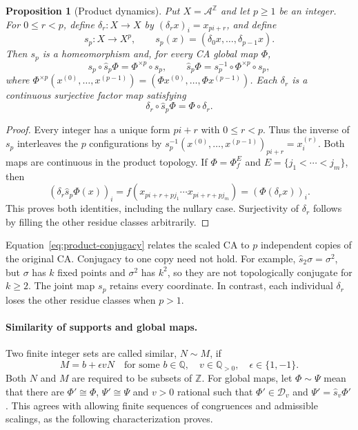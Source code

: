\documentclass[11pt,a4paper]{article}
\newenvironment{revision}{\color{blue}}{}
\newenvironment{revision}{\color{black}}{}
\newcommand{\locmark}[1]{\label{#1}\linelabel{line:#1}}
\newtheorem{prop}{Proposition}
\begin{document}
\begin{revision}
\begin{prop}[Product dynamics]\label{prop:product}
\locmark{loc:product}
Put $X=\mathcal A^{\mathbb Z}$ and let $p\geq1$ be an integer.
For $0\leq r<p$, define $\delta_r:X\to X$ by
$(\delta_rx)_i=x_{pi+r}$, and define
\[
s_p:X\longrightarrow X^p,\qquad
s_p(x)=(\delta_0x,\ldots,\delta_{p-1}x).
\]
Then $s_p$ is a homeomorphism and, for every CA global map $\Phi$,
\begin{equation}\label{eq:product-conjugacy}
s_p\circ\hat s_p\Phi=\Phi^{\times p}\circ s_p,
\qquad
\hat s_p\Phi=s_p^{-1}\circ\Phi^{\times p}\circ s_p,
\end{equation}
where $\Phi^{\times p}(x^{(0)},\ldots,x^{(p-1)})
=(\Phi x^{(0)},\ldots,\Phi x^{(p-1)})$.
Each $\delta_r$ is a continuous surjective factor map satisfying
\begin{equation}\label{eq:decimation-factor}
\delta_r\circ\hat s_p\Phi=\Phi\circ\delta_r.
\end{equation}
\end{prop}
\begin{proof}
Every integer has a unique form $pi+r$ with $0\leq r<p$.
Thus the inverse of $s_p$ interleaves the $p$ configurations by
$s_p^{-1}(x^{(0)},\ldots,x^{(p-1)})_{pi+r}=x_i^{(r)}$.
Both maps are continuous in the product topology. If
$\Phi=\Phi_f^E$ and $E=\{j_1<\cdots<j_m\}$, then
\[
(\delta_r\hat s_p\Phi(x))_i
=f(x_{pi+r+pj_1}\cdots x_{pi+r+pj_m})
=(\Phi(\delta_rx))_i.
\]
This proves both identities, including the nullary case. Surjectivity of
$\delta_r$ follows by filling the other residue classes arbitrarily.
\end{proof}
Equation~\eqref{eq:product-conjugacy} relates the scaled CA to
$p$ independent copies of the original CA. Conjugacy to one copy
need not hold. For example,
$\hat s_2\sigma=\sigma^2$, but $\sigma$ has $k$ fixed points and
$\sigma^2$ has $k^2$, so they are not topologically conjugate for $k\geq2$.
The joint map $s_p$ retains every coordinate. In contrast, each individual
$\delta_r$ loses the other residue classes when $p>1$.

\paragraph{Similarity of supports and global maps.}
Two finite integer sets are called similar, $N\sim M$, if
\[
M=b+\epsilon vN
\quad\text{for some }b\in\mathbb Q,\quad
v\in\mathbb Q_{>0},\quad\epsilon\in\{1,-1\}.
\]
Both $N$ and $M$ are required to be subsets of $\mathbb Z$.
For global maps, let $\Phi\sim\Psi$ mean that there are
$\Phi'\cong\Phi$, $\Psi'\cong\Psi$ and $v>0$ rational such that
$\Phi'\in\mathcal D_v$ and $\Psi'=\hat s_v\Phi'$.
This agrees with allowing finite sequences of congruences and admissible
scalings, as the following characterization proves.


\end{revision}
\end{document}
